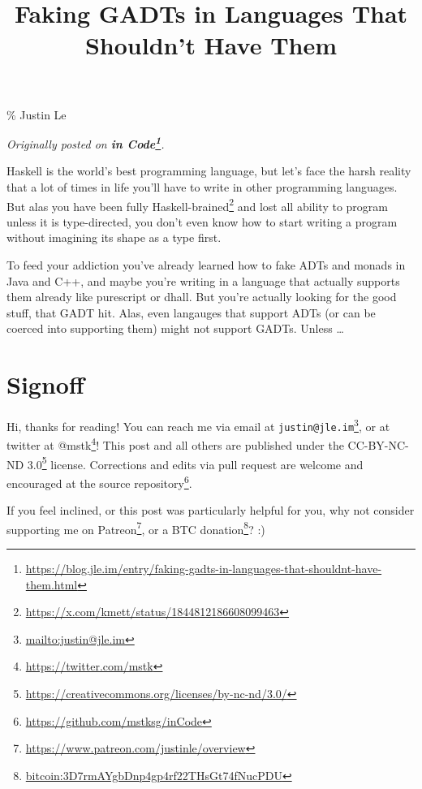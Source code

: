 \documentclass[]{article}
\title{Faking GADTs in Languages That Shouldn't Have Them}
\renewcommand{\href}[2]{#2\footnote{\url{#1}}}
\begin{document}
\maketitle

\% Justin Le

\emph{Originally posted on
\textbf{\href{https://blog.jle.im/entry/faking-gadts-in-languages-that-shouldnt-have-them.html}{in
Code}}.}

Haskell is the world's best programming language, but let's face the harsh
reality that a lot of times in life you'll have to write in other programming
languages. But alas you have been fully
\href{https://x.com/kmett/status/1844812186608099463}{Haskell-brained} and lost
all ability to program unless it is type-directed, you don't even know how to
start writing a program without imagining its shape as a type first.

To feed your addiction you've already learned how to fake ADTs and monads in
Java and C++, and maybe you're writing in a language that actually supports them
already like purescript or dhall. But you're actually looking for the good
stuff, that GADT hit. Alas, even langauges that support ADTs (or can be coerced
into supporting them) might not support GADTs. Unless \ldots{}

\section{Signoff}\label{signoff}

Hi, thanks for reading! You can reach me via email at
\href{mailto:justin@jle.im}{\nolinkurl{justin@jle.im}}, or at twitter at
\href{https://twitter.com/mstk}{@mstk}! This post and all others are published
under the \href{https://creativecommons.org/licenses/by-nc-nd/3.0/}{CC-BY-NC-ND
3.0} license. Corrections and edits via pull request are welcome and encouraged
at \href{https://github.com/mstksg/inCode}{the source repository}.

If you feel inclined, or this post was particularly helpful for you, why not
consider \href{https://www.patreon.com/justinle/overview}{supporting me on
Patreon}, or a \href{bitcoin:3D7rmAYgbDnp4gp4rf22THsGt74fNucPDU}{BTC donation}?
:)
\end{document}
